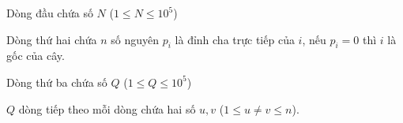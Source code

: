 Dòng đầu chứa số $N$ ($1\le N \le 10^5$)

Dòng thứ hai chứa $n$ số nguyên $p_i$ là đỉnh cha trực tiếp của $i$, nếu $p_i = 0$ thì $i$ là gốc của cây.

Dòng thứ ba chứa số $Q$ ($1\le Q\le 10^5$)

$Q$ dòng tiếp theo mỗi dòng chứa hai số $u, v$ ($1\le u\neq v\le n$).